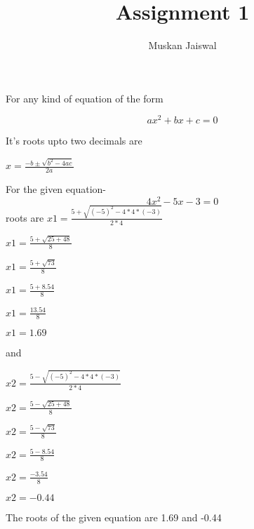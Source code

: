 \documentclass[12pt]{article}
\begin{document}
\title{ Assignment 1}
\author{Muskan Jaiswal}

\maketitle




For any kind of equation of the form 

\begin{equation}
ax^2+bx+c=0
\end{equation}

It's roots upto two decimals  are


$x=\frac{-b\pm\sqrt{b^2-4ac}}{2a}$

For the given equation-
\begin{equation}
    4x^2-5x-3=0
\end{equation}
roots are $x1=\frac{5+\sqrt{(-5)^2-4*4*(-3)}}{2*4}
$


$x1=\frac{5+\sqrt{25+48}}{8}
$

$x1=\frac{5+\sqrt{73}}{8}
$

$x1=\frac{5+8.54}{8}
$

$x1=\frac{13.54}{8}
$

$x1=1.69
$


and

$x2=\frac{5-\sqrt{(-5)^2-4*4*(-3)}}{2*4}
$

$x2=\frac{5-\sqrt{25+48}}{8}
$

$x2=\frac{5-\sqrt{73}}{8}
$

$x2=\frac{5-8.54}{8}
$

$x2=\frac{-3.54}{8}
$

$x2=-0.44
$

The roots of the given equation are 1.69 and -0.44
\end{document}

